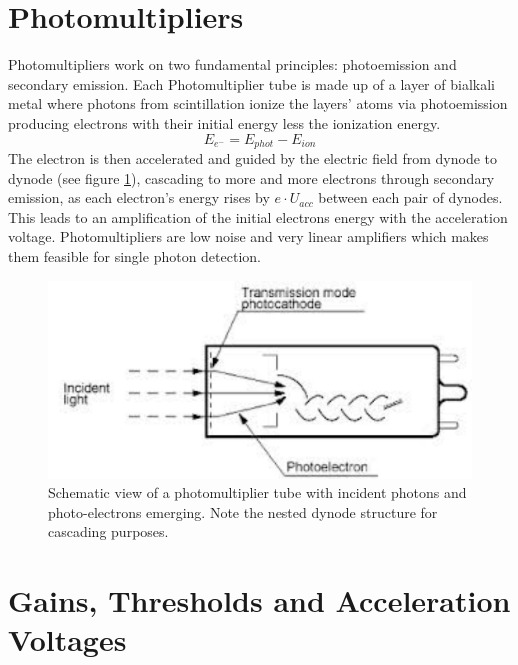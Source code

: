   \section{Photomultipliers}
  \label{ch:The muon detection system:sec:Photomultipliers}
  Photomultipliers work on two fundamental principles: photoemission and secondary emission.
  Each Photomultiplier tube is made up of a layer of bialkali metal where photons from scintillation ionize the layers' atoms via photoemission producing electrons with their initial energy less the ionization energy.
  $$E_{e^-} = E_{phot} - E_{ion}$$
  The electron is then accelerated and guided by the electric field from dynode to dynode (see figure \ref{fig:PMT}), cascading to more and more electrons through secondary emission, as each electron's energy rises by $e\cdot U_{acc}$ between each pair of dynodes. This leads to an amplification of the initial electrons energy with the acceleration voltage. Photomultipliers are low noise and very linear amplifiers which makes them feasible for single photon detection.
  \begin{figure}
  	\centering
  	\includegraphics[width = 0.5 \textwidth]{graphics/setup/PMT.pdf}
  	\caption[Photomultiplier tube]{Schematic view of a photomultiplier tube with incident photons and photo-electrons emerging. Note the nested dynode structure for cascading purposes.}
  	\label{fig:PMT}
  \end{figure}

  
  
  \section{Gains, Thresholds and Acceleration Voltages}
  \label{ch:The muon detection system:sec:Gains, Thresholds and Acceleration Voltages}

